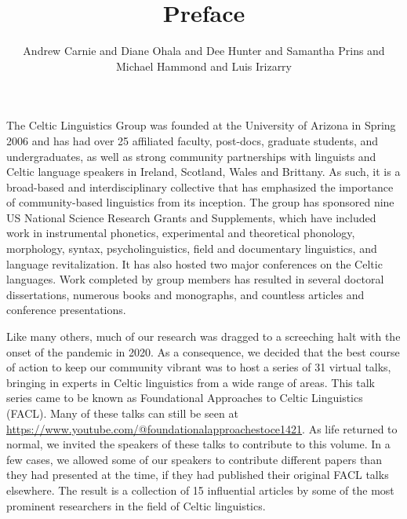 \documentclass[output=paper]{langscibook}
\title{Preface}
\author{Andrew Carnie and         Diane Ohala and         Dee Hunter and         Samantha Prins and          Michael Hammond and         Luis Irizarry\affiliation{University of Arizona}        }
\begin{document}
\maketitle

\noindent 
The Celtic Linguistics Group was founded at the University of Arizona in Spring 2006 and has had over 25 affiliated faculty, post-docs, graduate students, and undergraduates, as well as strong community partnerships with linguists and Celtic language speakers in Ireland, Scotland, Wales and Brittany. As such, it is a broad-based and interdisciplinary collective that has emphasized the importance of community-based linguistics from its inception. The group has sponsored nine US National Science Research Grants and Supplements, which have included work in instrumental phonetics, experimental and theoretical phonology, morphology, syntax, psycholinguistics, field and documentary linguistics, and language revitalization. It has also hosted two major conferences on the Celtic languages. Work completed by group members has resulted in several doctoral dissertations, numerous books and monographs, and countless articles and conference presentations. 

Like many others, much of our research was dragged to a screeching halt with the onset of the pandemic in 2020. As a consequence, we decided that the best course of action to keep our community vibrant was to host a series of 31 virtual talks, bringing in experts in Celtic linguistics from a wide range of areas. This talk series came to be known as Foundational Approaches to Celtic Linguistics (FACL). Many of these talks can still be seen at \url{https://www.youtube.com/@foundationalapproachestoce1421}. As life returned to normal, we invited the speakers of these talks to contribute to this volume. In a few cases, we allowed some of our speakers to contribute different papers than they had presented at the time, if they had published their original FACL talks elsewhere. The result is a collection of 15 influential articles by some of the most prominent researchers in the field of Celtic linguistics.
\end{document}
